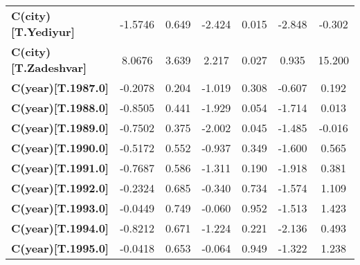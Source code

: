 \begin{center}
\begin{tabular}{lcccccc}
\textbf{C(city)[T.Yediyur]}                                                                         &      -1.5746  &        0.649     &    -2.424  &         0.015        &       -2.848    &       -0.302     \\
\textbf{C(city)[T.Zadeshvar]}                                                                       &       8.0676  &        3.639     &     2.217  &         0.027        &        0.935    &       15.200     \\
\textbf{C(year)[T.1987.0]}                                                                          &      -0.2078  &        0.204     &    -1.019  &         0.308        &       -0.607    &        0.192     \\
\textbf{C(year)[T.1988.0]}                                                                          &      -0.8505  &        0.441     &    -1.929  &         0.054        &       -1.714    &        0.013     \\
\textbf{C(year)[T.1989.0]}                                                                          &      -0.7502  &        0.375     &    -2.002  &         0.045        &       -1.485    &       -0.016     \\
\textbf{C(year)[T.1990.0]}                                                                          &      -0.5172  &        0.552     &    -0.937  &         0.349        &       -1.600    &        0.565     \\
\textbf{C(year)[T.1991.0]}                                                                          &      -0.7687  &        0.586     &    -1.311  &         0.190        &       -1.918    &        0.381     \\
\textbf{C(year)[T.1992.0]}                                                                          &      -0.2324  &        0.685     &    -0.340  &         0.734        &       -1.574    &        1.109     \\
\textbf{C(year)[T.1993.0]}                                                                          &      -0.0449  &        0.749     &    -0.060  &         0.952        &       -1.513    &        1.423     \\
\textbf{C(year)[T.1994.0]}                                                                          &      -0.8212  &        0.671     &    -1.224  &         0.221        &       -2.136    &        0.493     \\
\textbf{C(year)[T.1995.0]}                                                                          &      -0.0418  &        0.653     &    -0.064  &         0.949        &       -1.322    &        1.238     \\

\end{tabular}
\end{center}
